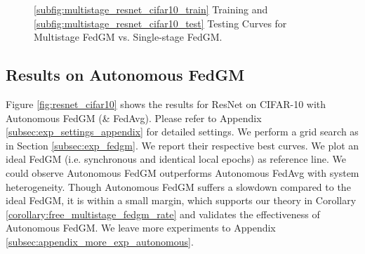 \begin{figure}[h]

\centering
{}

\caption{\ref{subfig:multistage_resnet_cifar10_train} Training and \ref{subfig:multistage_resnet_cifar10_test} Testing Curves for Multistage FedGM vs. Single-stage FedGM.}
\label{fig:resnet_cifar10_multistage}
\end{figure}




\subsection{Results on Autonomous FedGM}
\label{subsec:exp_autonomous_fedgm}

Figure \ref{fig:resnet_cifar10} shows the results for ResNet on CIFAR-10 with Autonomous FedGM (\& FedAvg). Please refer to Appendix \ref{subsec:exp_settings_appendix} for detailed settings. We perform a grid search as in Section \ref{subsec:exp_fedgm}. We report their respective best curves. We plot an ideal FedGM (i.e. synchronous and identical local epochs) as reference line. We could observe Autonomous FedGM outperforms Autonomous FedAvg with system heterogeneity. Though Autonomous FedGM suffers a slowdown compared to the ideal FedGM, it is within a small margin, which supports our theory in Corollary \ref{corollary:free_multistage_fedgm_rate} and validates the effectiveness of Autonomous FedGM. We leave more experiments to Appendix \ref{subsec:appendix_more_exp_autonomous}.






